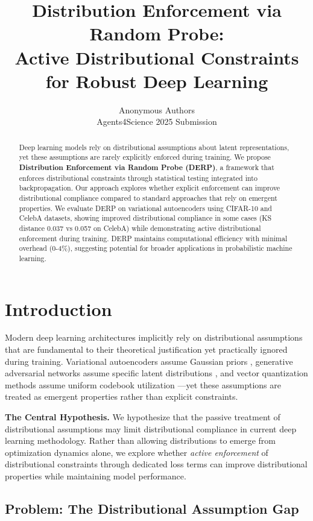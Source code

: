 \documentclass[11pt]{article}
\title{Distribution Enforcement via Random Probe:\\
Active Distributional Constraints for Robust Deep Learning}
\author{
    Anonymous Authors\\
    Agents4Science 2025 Submission
}
\date{}
\begin{document}
\maketitle

\begin{abstract}
Deep learning models rely on distributional assumptions about latent representations, yet these assumptions are rarely explicitly enforced during training. We propose \textbf{Distribution Enforcement via Random Probe (DERP)}, a framework that enforces distributional constraints through statistical testing integrated into backpropagation. Our approach explores whether explicit enforcement can improve distributional compliance compared to standard approaches that rely on emergent properties. We evaluate DERP on variational autoencoders using CIFAR-10 and CelebA datasets, showing improved distributional compliance in some cases (KS distance 0.037 vs 0.057 on CelebA) while demonstrating active distributional enforcement during training. DERP maintains computational efficiency with minimal overhead (0-4\%), suggesting potential for broader applications in probabilistic machine learning.
\end{abstract}

\section{Introduction}

Modern deep learning architectures implicitly rely on distributional assumptions that are fundamental to their theoretical justification yet practically ignored during training. Variational autoencoders assume Gaussian priors \cite{kingma2014auto}, generative adversarial networks assume specific latent distributions \cite{goodfellow2014generative}, and vector quantization methods assume uniform codebook utilization \cite{oord2017neural}—yet these assumptions are treated as emergent properties rather than explicit constraints.

\textbf{The Central Hypothesis.} We hypothesize that the passive treatment of distributional assumptions may limit distributional compliance in current deep learning methodology. Rather than allowing distributions to emerge from optimization dynamics alone, we explore whether \emph{active enforcement} of distributional constraints through dedicated loss terms can improve distributional properties while maintaining model performance.

\subsection{Problem: The Distributional Assumption Gap}
\end{document}
